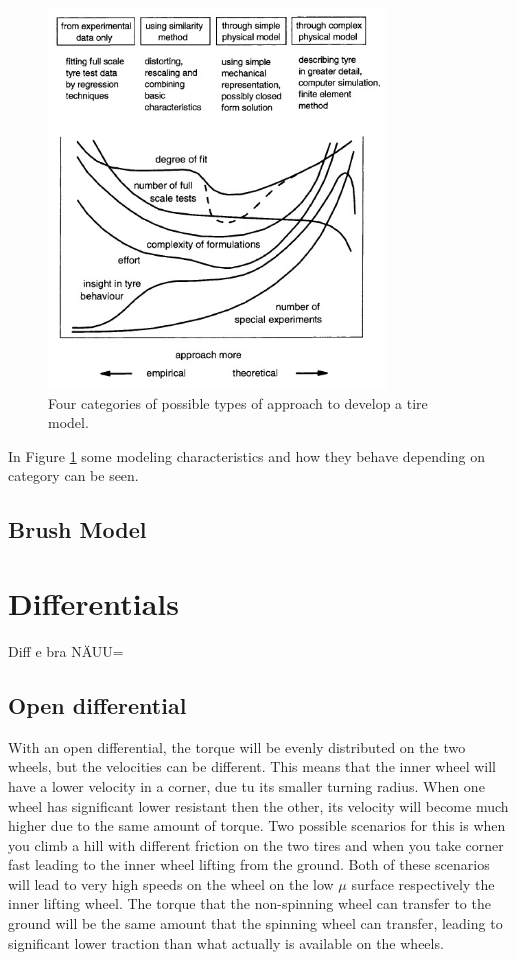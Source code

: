 \begin{figure}[h]
	\centering
	\includegraphics[width=0.8\textwidth]{Pictures/tire_modeling}
	\caption{Four categories of possible types of approach to develop a tire model. \cite{pacejka}}
	\label{tire_modeling}
\end{figure}

In Figure \ref{tire_modeling} some modeling characteristics and how they behave depending on category can be seen.

\subsection{Brush Model}



\section{Differentials}

Diff e bra NÄUU=

\subsection{Open differential}

With an open differential, the torque will be evenly distributed on the two wheels, but the velocities can be different. This means that the inner wheel will have a lower velocity in a corner, due tu its smaller turning radius. When one wheel has significant lower resistant then the other, its velocity will become much higher due to the same amount of torque. Two possible scenarios for this is when you climb a hill with different friction on the two tires and when you take corner fast leading to the inner wheel lifting from the ground. Both of these scenarios will lead to very high speeds on the wheel on the low $ \mu $ surface respectively the inner lifting wheel. The torque that the non-spinning wheel can transfer to the ground will be the same amount that the spinning wheel can transfer, leading to significant lower traction than what actually is available on the wheels.

